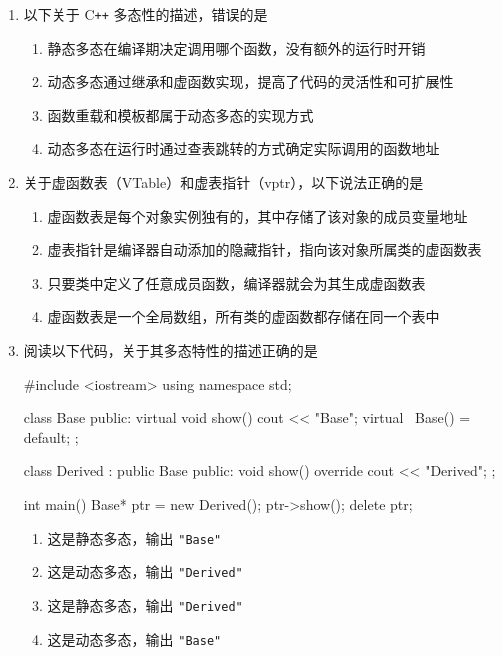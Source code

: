 \documentclass[UTF8,fontset=fandol,zihao=-4,a4paper]{ctexart}
\newcommand{\choicebox}{\makebox[1.7cm][c]{（\qquad）}}
\newenvironment{codekeep}
  {\par\smallskip\noindent\begin{minipage}{\linewidth}}
  {\end{minipage}\par\smallskip}
\begin{document}
\begin{enumerate}
  \item 以下关于 C\texttt{++} 多态性的描述，错误的是\choicebox
  \begin{enumerate}
    \item 静态多态在编译期决定调用哪个函数，没有额外的运行时开销
    \item 动态多态通过继承和虚函数实现，提高了代码的灵活性和可扩展性
    \item 函数重载和模板都属于动态多态的实现方式
    \item 动态多态在运行时通过查表跳转的方式确定实际调用的函数地址
  \end{enumerate}

  \item 关于虚函数表（VTable）和虚表指针（vptr），以下说法正确的是\choicebox
  \begin{enumerate}
    \item 虚函数表是每个对象实例独有的，其中存储了该对象的成员变量地址
    \item 虚表指针是编译器自动添加的隐藏指针，指向该对象所属类的虚函数表
    \item 只要类中定义了任意成员函数，编译器就会为其生成虚函数表
    \item 虚函数表是一个全局数组，所有类的虚函数都存储在同一个表中
  \end{enumerate}

  \item 阅读以下代码，关于其多态特性的描述正确的是\choicebox

\begin{codekeep}
\begin{cppcode}
#include <iostream>
using namespace std;

class Base {
public:
    virtual void show() { cout << "Base"; }
    virtual ~Base() = default;
};

class Derived : public Base {
public:
    void show() override { cout << "Derived"; }
};

int main() {
    Base* ptr = new Derived();
    ptr->show();
    delete ptr;
}
\end{cppcode}
\end{codekeep}

  \begin{enumerate}
    \item 这是静态多态，输出 \texttt{"Base"}
    \item 这是动态多态，输出 \texttt{"Derived"}
    \item 这是静态多态，输出 \texttt{"Derived"}
    \item 这是动态多态，输出 \texttt{"Base"}
  \end{enumerate}


\end{enumerate}
\end{document}
